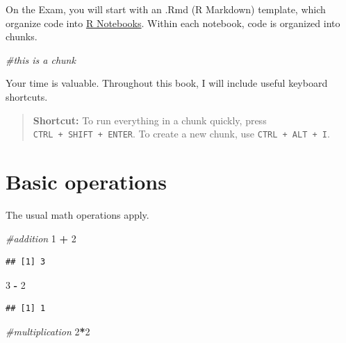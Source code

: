 \documentclass[openany]{book}
\newenvironment{Shaded}{\begin{snugshade}}{\end{snugshade}}
\newcommand{\CommentTok}[1]{\textcolor[rgb]{0.56,0.35,0.01}{\textit{#1}}}
\newcommand{\DecValTok}[1]{\textcolor[rgb]{0.00,0.00,0.81}{#1}}
\newcommand{\OperatorTok}[1]{\textcolor[rgb]{0.81,0.36,0.00}{\textbf{#1}}}
\newcommand{\StringTok}[1]{\textcolor[rgb]{0.31,0.60,0.02}{#1}}
\begin{document}
On the Exam, you will start with an .Rmd (R Markdown) template, which organize code into \href{https://bookdown.org/yihui/rmarkdown/notebook.html}{R Notebooks}. Within each notebook, code is organized into chunks.

\begin{Shaded}
\begin{Highlighting}[]
\CommentTok{#this is a chunk}
\end{Highlighting}
\end{Shaded}

Your time is valuable. Throughout this book, I will include useful keyboard shortcuts.

\begin{quote}
\textbf{Shortcut:} To run everything in a chunk quickly, press \texttt{CTRL\ +\ SHIFT\ +\ ENTER}. To create a new chunk, use \texttt{CTRL\ +\ ALT\ +\ I}.
\end{quote}

\hypertarget{basic-operations}{%
\section{Basic operations}\label{basic-operations}}

The usual math operations apply.

\begin{Shaded}
\begin{Highlighting}[]
\CommentTok{#addition}
\DecValTok{1} \OperatorTok{+}\StringTok{ }\DecValTok{2} 
\end{Highlighting}
\end{Shaded}

\begin{verbatim}
## [1] 3
\end{verbatim}

\begin{Shaded}
\begin{Highlighting}[]
\DecValTok{3} \OperatorTok{-}\StringTok{ }\DecValTok{2}
\end{Highlighting}
\end{Shaded}

\begin{verbatim}
## [1] 1
\end{verbatim}

\begin{Shaded}
\begin{Highlighting}[]
\CommentTok{#multiplication}
\DecValTok{2}\OperatorTok{*}\DecValTok{2}
\end{Highlighting}
\end{Shaded}
\end{document}
